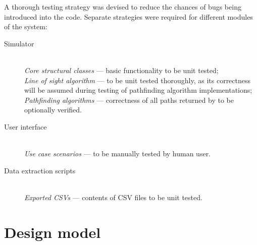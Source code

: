 \documentclass[12pt,notitlepage]{report}
\begin{document}
A thorough testing strategy was devised to reduce the chances of bugs being introduced into the code. Separate strategies were required for different modules of the system:

\begin{description}
\item[Simulator]\hfil \\
{\em Core structural classes} --- basic functionality to be unit tested;\\
{\em Line of sight algorithm} --- to be unit tested thoroughly, as its correctness will be assumed during testing of pathfinding algorithm implementations;\\
{\em Pathfinding algorithms} --- correctness of all paths returned by to be optionally verified.
\end{description}
\begin{description}
\item[User interface]\hfil \\
{\em Use case scenarios} --- to be manually tested by human user.
\end{description}
\begin{description}
\item[Data extraction scripts]\hfil \\
{\em Exported CSVs} --- contents of CSV files to be unit tested.
\end{description}

\section {Design model}
\end{document}
